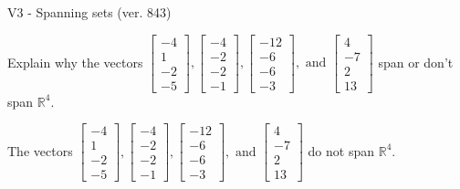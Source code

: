 \begin{exercise}
  \begin{exerciseTitle}V3 - Spanning sets (ver. 843)\end{exerciseTitle}
  \begin{exerciseStatement}
    Explain why the vectors \(\left[\begin{array}{r}
-4 \\
1 \\
-2 \\
-5
\end{array}\right] , \left[\begin{array}{r}
-4 \\
-2 \\
-2 \\
-1
\end{array}\right] , \left[\begin{array}{r}
-12 \\
-6 \\
-6 \\
-3
\end{array}\right] , \text{ and } \left[\begin{array}{r}
4 \\
-7 \\
2 \\
13
\end{array}\right]\) span or don't span \(\mathbb{R}^4\). 
	


  \end{exerciseStatement}
  \begin{exerciseAnswer}
   The vectors \(\left[\begin{array}{r}
-4 \\
1 \\
-2 \\
-5
\end{array}\right] , \left[\begin{array}{r}
-4 \\
-2 \\
-2 \\
-1
\end{array}\right] , \left[\begin{array}{r}
-12 \\
-6 \\
-6 \\
-3
\end{array}\right] , \text{ and } \left[\begin{array}{r}
4 \\
-7 \\
2 \\
13
\end{array}\right]\) 
  	 do not  
	span \(\mathbb{R}^4\).
  


  \end{exerciseAnswer}
\end{exercise}